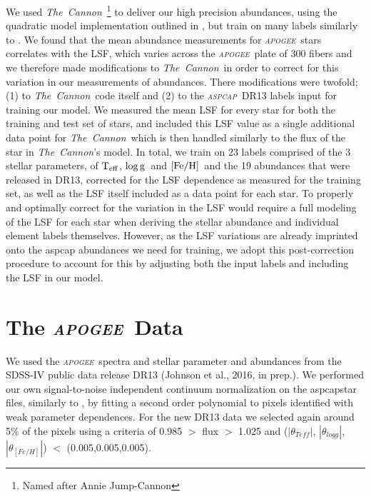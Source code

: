 \documentclass[14pt, preprint2]{aastex6}
\newcommand{\project}[1]{\textsl{#1}}
\newcommand{\tc}{\project{The~Cannon}}
\newcommand{\apogee}{\project{\textsc{apogee}}}
\newcommand{\aspcap}{\project{\textsc{aspcap}}}
\newcommand{\teff}{\mbox{$\rm T_{eff}$}}
\newcommand{\feh}{\mbox{$\rm [Fe/H]$}}
\newcommand{\logg}{\mbox{$\rm \log g$}}
\begin{document}
We used \tc\ \citep{Ness2015}\footnote{Named after Annie Jump-Cannon} to deliver our high precision abundances, using the quadratic model implementation outlined in \citet{Ness2015}, but train on many labels similarly to \citet{Casey2016}. We found that the mean abundance measurements for \apogee\ stars correlates with the LSF, which varies across the \apogee\ plate of 300 fibers and we therefore made modifications to \tc\ in order to correct for this variation in our measurements of abundances. There modifications were twofold; (1) to \tc\ code itself and (2) to the \aspcap\ DR13 labels input for training our model.  We measured the mean LSF for every star for both the training and test set of stars, and included this LSF value as a single additional data point for \tc\, which is then handled similarly to the flux of the star in \tc's model. In total, we train on 23 labels comprised of the 3 stellar parameters, of \teff, \logg\ and \feh\ and the 19 abundances that were released in DR13, corrected for the LSF dependence as measured for the training set, as well as the LSF itself included as a data point for each star.  To properly and optimally correct for the variation in the LSF would require a full modeling of the LSF for each star when deriving the stellar abundance and individual element labels themselves. However, as the LSF variations are already imprinted onto the aspcap abundances we need for training, we adopt this post-correction procedure to account for this by adjusting both the input labels and including the LSF in our model. %

\section{The \apogee\ Data}

We used the \apogee\ spectra \citep{sdssiv, Majewski2012} and stellar parameter and abundances from the SDSS-IV public data release DR13 (Johnson et al., 2016, in prep.). We performed our own signal-to-noise independent continuum normalization on the aspcapstar files, similarly to \citet{Ness2015}, by fitting a second order polynomial to pixels identified with weak parameter dependences. For the new DR13 data we selected again around 5\% of the pixels using a criteria of 0.985 $>$ flux $>$ 1.025 and ($|\theta_{Teff}|$, $|\theta_{logg}|$, $|\theta_{[Fe/H]}|$) $<$  (0.005,0.005,0.005). 
\end{document}
